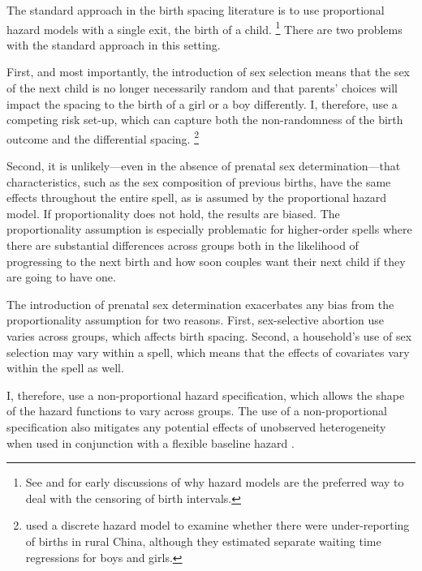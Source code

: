\documentclass[12pt,letterpaper]{article}
\begin{document}
The standard approach in the birth spacing literature is to use proportional hazard
models with a single exit, the birth of a child.%
\footnote{
See \citet{Sheps1970} and \citet{Newman1984} for early discussions of why 
hazard models are the preferred way to deal with the censoring of birth
intervals.
}
There are two problems with the standard approach in this setting.

First, and most importantly, the introduction of sex selection means that the sex of the 
next child is no longer necessarily random and that parents' choices will impact the 
spacing to the birth of a girl or a boy differently.
I, therefore, use a competing risk set-up, which can capture both the non-randomness of
the birth outcome and the differential spacing.%
\footnote{
\cite{Merli2000} used a discrete hazard model to examine whether 
there were under-reporting of births in rural China, although they 
estimated separate waiting time regressions for boys and girls.
}

Second, it is unlikely---even in the absence of prenatal sex determination---that 
characteristics, such as the sex composition of previous births, have the same effects 
throughout the entire spell, as is assumed by the proportional hazard model.
If proportionality does not hold, the results are biased.
The proportionality assumption is especially problematic for higher-order spells where 
there are substantial differences across groups both in the likelihood of progressing to 
the next birth and how soon couples want their next child if they are going to have one.

The introduction of prenatal sex determination exacerbates any bias from
the proportionality assumption for two reasons. 
First, sex-selective abortion use varies across groups, which affects birth spacing. 
Second,
a household's use of sex selection may vary within a spell, which means
that the effects of covariates vary within the spell as well.

I, therefore, use a non-proportional hazard specification, which allows the shape of the 
hazard functions to vary across groups.
The use of a non-proportional specification also mitigates any potential effects 
of unobserved heterogeneity when used in conjunction with a flexible baseline hazard 
\citep{Dolton1995}.
\end{document}
